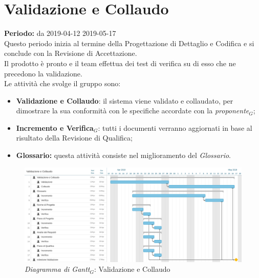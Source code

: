 \section{Validazione e Collaudo}
\textbf{Periodo:} da 2019-04-12 2019-05-17\\
Questo periodo inizia al termine della Progettazione di Dettaglio e Codifica e si conclude con la Revisione di Accettazione.\\
Il prodotto è pronto e il team effettua dei test di verifica su di esso che ne precedono la validazione.\\
Le attività che svolge il gruppo sono:
\begin{itemize}
    \item \textbf{Validazione e Collaudo}: il sistema viene validato e collaudato, per dimostrare la sua conformità con le specifiche accordate con la \textit{proponente$_{G}$};
    \item \textbf{Incremento e Verifica$_{G}$}: tutti i documenti verranno aggiornati in base al risultato della Revisione di Qualifica;
    \item \textbf{Glossario:} questa attività consiste nel miglioramento del \textit{Glossario}.
\end{itemize}
\begin{figure} [h]
    \centering
    \includegraphics[scale=0.14]{./images/validazione_collaudo.jpg}
    \caption{\textit{Diagramma di Gantt$_{G}$}: Validazione e Collaudo }\label{}
\end{figure}